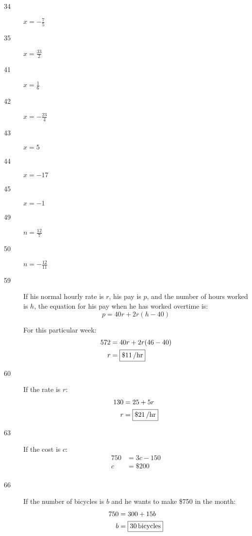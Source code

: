 \documentclass[letterpaper]{exam}
\begin{document}
\begin{description}
      \item[34] $x = \boxed{ - \frac{7}{5} }$

      \item[35] $x = \boxed{ \frac{33}{2} }$

      \item[41] $x = \boxed{ \frac{1}{6} }$

      \item[42] $x = \boxed{ - \frac{23}{4} }$
        
      \item[43] $x = \boxed{ 5 }$

      \item[44] $x = \boxed{ -17 }$

      \item[45] $x = \boxed{ -1 }$

      \item[49] $n = \boxed{ \frac{12}{7} }$

      \item[50] $n = \boxed{ - \frac{12}{11} }$

      \item[59]
        If his normal hourly rate is $r$, his pay is $p$, and the number of hours worked is $h$, the
        equation for his pay when he has worked overtime is:
        \[
          p = 40r + 2r(h - 40)
        \]

        For this particular week:
        \begin{align*}
          572 & = 40r + 2r(46 - 40) \\
          r   & = \boxed{ \unit[\$11]{/hr} } \\
        \end{align*}

      \item[60]
        If the rate is $r$:
        \begin{align*}
          130 & = 25 + 5r \\
          r   & = \boxed{ \unit[\$21]{/hr} } \\
        \end{align*}

      \item[63]
        If the cost is $c$:
        \begin{align*}
          750 & = 3c - 150 \\
          c   & = \boxed{ \$ 200 } \\
        \end{align*}

      \item[66]
        If the number of bicycles is $b$ and he wants to make \$750 in the month:
        \begin{align*}
          750 & = 300 + 15b \\
          b   & = \boxed{ \unit[30]{bicycles} } \\
        \end{align*}

    \end{description}
\end{document}
